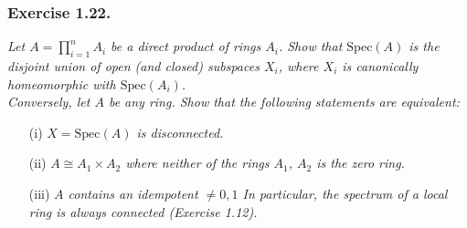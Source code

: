 \documentclass{article}
\begin{document}



\subsubsection*{Exercise 1.22.}
\emph{Let $A = \prod_{i=1}^{n} A_i$ be a direct product of rings $A_i$.
Show that $\mathrm{Spec}(A)$ is the disjoint union of open (and closed) subspaces $X_i$,
where $X_i$ is canonically homeomorphic with $\mathrm{Spec}(A_i)$.} \\

\emph{Conversely, let $A$ be any ring.
Show that the following statements are equivalent:}
\begin{enumerate}
\item[(i)]
  \emph{$X = \mathrm{Spec}(A)$ is disconnected.}
\item[(ii)]
  \emph{$A \cong A_1 \times A_2$ where neither of the rings $A_1$, $A_2$ is the zero ring.}
\item[(iii)]
  \emph{$A$ contains an idempotent $\neq 0, 1$
  In particular, the spectrum of a local ring is always connected (Exercise 1.12).} \\
\end{enumerate}
\end{document}
